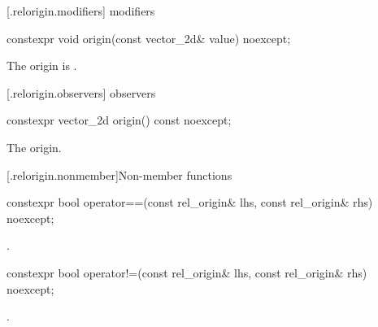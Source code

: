  [\iotwod.relorigin.modifiers]{ modifiers}

%
\begin{itemdecl}
constexpr void origin(const vector_2d& value) noexcept;
\end{itemdecl}
\begin{itemdescr}
\pnum
\effects
The origin is .
\end{itemdescr}

 [\iotwod.relorigin.observers]{ observers}

%
\begin{itemdecl}
constexpr vector_2d origin() const noexcept;
\end{itemdecl}
\begin{itemdescr}
\pnum
\returns
The origin.
\end{itemdescr}

 [\iotwod.relorigin.nonmember]{Non-member functions}

%
\begin{itemdecl}
constexpr bool operator==(const rel_origin& lhs, const rel_origin& rhs) 
  noexcept;
\end{itemdecl}
\begin{itemdescr}
\pnum
\returns
{}.
\end{itemdescr}

%
\begin{itemdecl}
constexpr bool operator!=(const rel_origin& lhs, const rel_origin& rhs) 
  noexcept;
\end{itemdecl}
\begin{itemdescr}
\pnum
\returns
{}.
\end{itemdescr}
